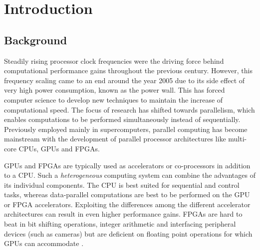 \chapter{Introduction}
\label{chapter:Introduction}





\section{Background}


Steadily rising processor clock frequencies were the driving force behind computational performance gains throughout the previous century.
However, this frequency scaling came to an end around the year 2005 due to its side effect of very high power consumption, known as the power wall.
This has forced computer science to develop new techniques to maintain the increase of computational speed.
The focus of research has shifted towards parallelism, which enables computations to be performed simultaneously instead of sequentially.
Previously employed mainly in supercomputers, parallel computing has become mainstream with the development of parallel processor architectures like multi-core CPUs, GPUs and FPGAs.







GPUs and FPGAs are typically used as accelerators or co-processors in addition to a CPU.
Such a \emph{heterogeneous} computing system can combine the advantages of its individual components.
The CPU is best suited for sequential and control tasks, whereas data-parallel computations are best to be performed on the GPU or FPGA accelerators.
Exploiting the differences among the different accelerator architectures can result in even higher performance gains.
FPGAs are hard to beat in bit shifting operations, integer arithmetic and interfacing peripheral devices (such as cameras) but are deficient on floating point operations for which GPUs can accommodate \cite{chimera}.


